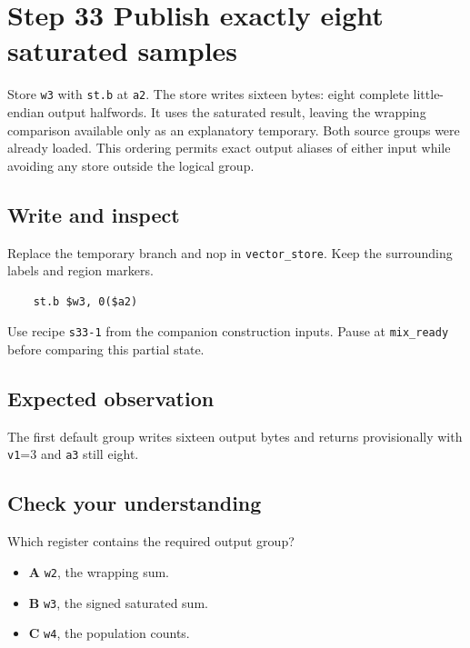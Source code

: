 \section{Step 33 Publish exactly eight saturated samples}\label{pcm-s33}

Store \texttt{w3} with \texttt{st.b} at \texttt{a2}. The store writes sixteen bytes: eight complete little-endian output halfwords. It uses the saturated result, leaving the wrapping comparison available only as an explanatory temporary. Both source groups were already loaded. This ordering permits exact output aliases of either input while avoiding any store outside the logical group.

\subsection{Write and inspect}
Replace the temporary branch and nop in \texttt{vector\_store}. Keep the surrounding labels and region markers.

\begin{verbatim}
    st.b $w3, 0($a2)
\end{verbatim}
Use recipe \texttt{s33-1} from the companion construction inputs. Pause at \texttt{mix\_ready} before comparing this partial state.

\subsection{Expected observation}
The first default group writes sixteen output bytes and returns provisionally with \texttt{v1}=3 and \texttt{a3} still eight.

\subsection{Check your understanding}
Which register contains the required output group?

\begin{itemize}
  \item \textbf{A} \texttt{w2}, the wrapping sum.
  \item \textbf{B} \texttt{w3}, the signed saturated sum.
  \item \textbf{C} \texttt{w4}, the population counts.
\end{itemize}
